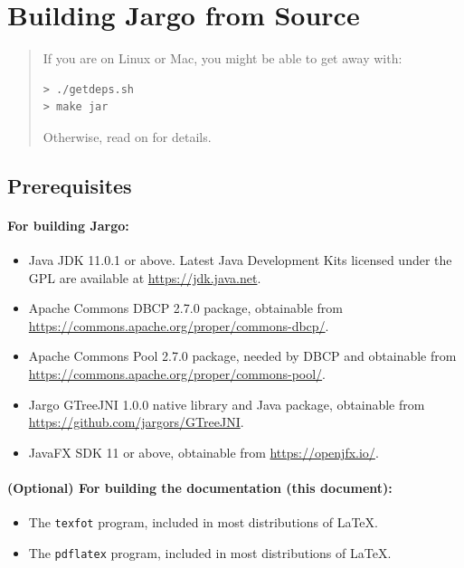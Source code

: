 \nwenddocs{}\chapter{Building Jargo from Source}
\label{ch:building}

\begin{quote}
If you are on Linux or Mac, you might be able to get away with:
\begin{verbatim}
> ./getdeps.sh
> make jar
\end{verbatim}
Otherwise, read on for details.
\end{quote}

\section{Prerequisites}
\label{sec:prereqs}

\subsubsection*{For building Jargo:}
\begin{itemize}
\item Java JDK 11.0.1 or above. Latest Java Development Kits licensed under the
GPL are available at \url{https://jdk.java.net}.
\item Apache Commons DBCP 2.7.0 package, obtainable from
\url{https://commons.apache.org/proper/commons-dbcp/}.
\item Apache Commons Pool 2.7.0 package, needed by DBCP and obtainable from
\url{https://commons.apache.org/proper/commons-pool/}.
\item Jargo GTreeJNI 1.0.0 native library and Java package, obtainable from
\url{https://github.com/jargors/GTreeJNI}.
\item JavaFX SDK 11 or above, obtainable from \url{https://openjfx.io/}.
\end{itemize}

\subsubsection*{(Optional) For building the documentation (this document):}
\begin{itemize}
\item The \texttt{texfot} program, included in most distributions of LaTeX.
\item The \texttt{pdflatex} program, included in most distributions of LaTeX.
\end{itemize}

